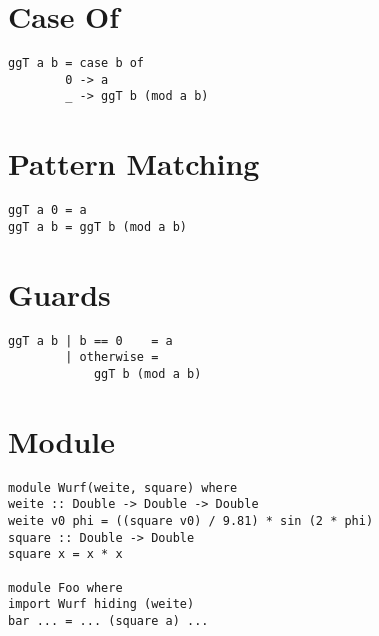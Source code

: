 \documentclass[
  10pt,                   %
  DIV12,
  german,                 %
  oneside,                %
  parskip=half,           %
  headings=normal,        %
  captions=tableheading,  %
]{scrartcl}
\begin{document}
\section{Case Of}
\begin{minipage}[hbt]{6cm}
\centering
\begin{lstlisting}
ggT a b = case b of 
        0 -> a
        _ -> ggT b (mod a b)
\end{lstlisting}
\end{minipage}
\hfill
\begin{minipage}[hbt]{8cm}
\centering
\scalebox{0.8}{}
\end{minipage}

\section{Pattern Matching}
\begin{minipage}[hbt]{6cm}
\centering
\begin{lstlisting}
ggT a 0 = a
ggT a b = ggT b (mod a b)
\end{lstlisting}
\end{minipage}
\hfill
\begin{minipage}[hbt]{8cm}
\centering
\scalebox{0.8}{}
\end{minipage}

\section{Guards}
\begin{minipage}[hbt]{6cm}
\centering
\begin{lstlisting}
ggT a b | b == 0    = a
        | otherwise = 
            ggT b (mod a b) 
\end{lstlisting}
\end{minipage}
\hfill
\begin{minipage}[hbt]{8cm}
\centering
\scalebox{0.8}{}
\end{minipage}

\section{Module}
\begin{lstlisting}
module Wurf(weite, square) where
weite :: Double -> Double -> Double
weite v0 phi = ((square v0) / 9.81) * sin (2 * phi)
square :: Double -> Double
square x = x * x

module Foo where
import Wurf hiding (weite)
bar ... = ... (square a) ...
\end{lstlisting}
\end{document}
